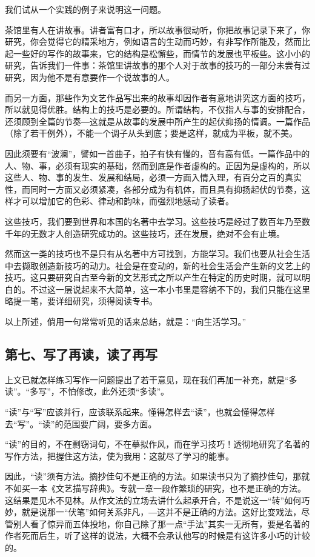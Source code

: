 \documentclass[fontset=fandol,12pt,a5paper]{ctexbook}
\begin{document}
我们试从一个实践的例子来说明这一问题。

茶馆里有人在讲故事。讲者富有口才，所以故事很动听，你把故事记录下来了，你研究，你会觉得它的精采地方，例如语言的生动而巧妙，有非写作所能及，然而比起一些好的写作的故事来，它的结构是松懈些，而情节的发展也平板些。这小小的研究，告诉我们一件事：茶馆里讲故事的那个人对于故事的技巧的一部分未尝有过研究，因为他不是有意要作一个说故事的人。

而另一方面，那些作为文艺作品写出来的故事却因作者有意地讲究这方面的技巧，所以就见得优胜。结构上的技巧是必要的。所谓结构，不仅指人与事的安排配合，还须顾到全篇的节奏―这就是从故事的发展中所产生的起伏抑扬的情调。一篇作品（除了若干例外），不能一个调子从头到底；要是这样，就成为平板，就不美。

因此须要有“波澜”，譬如一首曲子，拍子有快有慢的，音有高有低。一篇作品中的人、物、事，必须有现实的基础，然而到底是作者虚构的。正因为是虚构的，所以这些人、物、事的发生、发展和结局，必须一方面入情入理，有百分之百的真实性，而同时一方面又必须紧凑，各部分成为有机体，而且具有抑扬起伏的节奏，这样才可以增加它的色彩、律动和韵味，而强烈地感动了读者。

这些技巧，我们要到世界和本国的名著中去学习。这些技巧是经过了数百年乃至数千年的无数才人创造研究成功的。这些技巧，还在发展，绝对不会有止境。

然而这一类的技巧也不是只有从名著中方可找到，方能学习。我们也要从社会生活中去撷取创造新技巧的动力。社会是在变动的，新的社会生活会产生新的文艺上的技巧。这只要研究自古至今新的文艺形式之所以产生在特定的历史时期，就可以明白的。不过这一层说起来不大简单，这一本小书里是容纳不下的，我们只能在这里略提一笔，要详细研究，须得阅读专书。

以上所述，倘用一句常常听见的话来总结，就是：“向生活学习。”

\subsection{第七、写了再读，读了再写}
上文已就怎样练习写作一问题提出了若干意见，现在我们再加一补充，就是“多读”。“多写”，不怕修改，此外还须“多读”。

“读”与“写”应该并行，应该联系起来。懂得怎样去“读”，也就会懂得怎样去“写”。“读”的范围要广阔，要多方面。

“读”的目的，不在剽窃词句，不在摹拟作风，而在学习技巧！透彻地研究了名著的写作方法，把握住这方法，使为我用：这就尽了学习的能事。

因此，“读”须有方法。摘抄佳句不是正确的方法。如果读书只为了摘抄佳句，那就不如买一本《文艺描写辞典》。专就一章一段作繁琐的研究，也不是正确的方法。这结果是见木不见林。从作文法的立场去讲什么起承开合，不是说这一“转”如何巧妙，就是说那一“伏笔”如何关系非凡，―这并不是正确的方法。这好比变戏法，尽管别人看了惊异而五体投地，你自己除了那一点“手法”其实一无所有，要是名著的作者死而后生，听了这样的说法，大概不会承认他写的时候是有这许多小巧的计较的。
\end{document}
